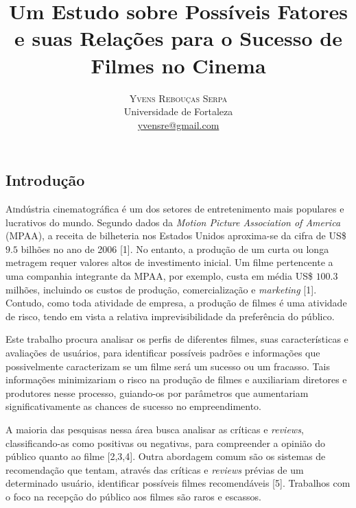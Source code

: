 \documentclass[twoside]{article}
\title{\vspace{-15mm}\fontsize{24pt}{10pt}\selectfont\textbf{Um Estudo sobre Possíveis Fatores e suas Relações para o Sucesso de Filmes no Cinema}} %
\author{
\large
\textsc{Yvens Rebouças Serpa}\\[2mm] %
\normalsize Universidade de Fortaleza \\ %
\normalsize \href{mailto:yvensre@gmail.com}{yvensre@gmail.com} %
\vspace{-5mm}
}
\date{}
\begin{document}
\maketitle %

\thispagestyle{fancy} %


\begin{multicols}{2} %

\section{Introdução}

\lettrine[nindent=0em,lines=3]
A indústria cinematográfica é um dos setores de entretenimento mais populares e lucrativos do mundo. Segundo dados da \textit{Motion Picture Association of America} (MPAA), a receita de bilheteria nos Estados Unidos aproxima-se da cifra de US\$ $9.5$ bilhões no ano de 2006 [1]. No entanto, a produção de um curta ou longa metragem requer valores altos de investimento inicial. Um filme pertencente a uma companhia integrante da MPAA, por exemplo, custa em média US\$ $100.3$ milhões, incluindo os custos de produção, comercialização e \textit{marketing} [1]. Contudo, como toda atividade de empresa, a produção de filmes é uma atividade de risco, tendo em vista a relativa imprevisibilidade da preferência do público.

Este trabalho procura analisar os perfis de diferentes filmes, suas características e avaliações de usuários, para identificar possíveis padrões e informações que possivelmente caracterizam se um filme será um sucesso ou um fracasso. Tais informações minimizariam o risco na produção de filmes e auxiliariam diretores e produtores nesse processo, guiando-os por parâmetros que aumentariam significativamente as chances de sucesso no empreendimento.

A maioria das pesquisas nessa área busca analisar as críticas e \textit{reviews}, classificando-as como positivas ou negativas, para compreender a opinião do público quanto ao filme [2,3,4]. Outra abordagem comum são os sistemas de recomendação que tentam, através das críticas e \textit{reviews} prévias de um determinado usuário, identificar possíveis filmes recomendáveis [5]. Trabalhos com o foco na recepção do público aos filmes são raros e escassos.


\end{multicols}
\end{document}
